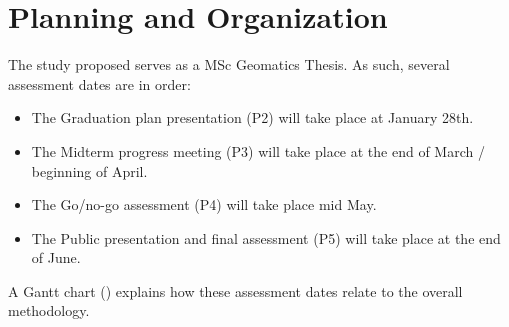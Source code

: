 \newpage
\section{Planning and Organization}

The study proposed serves as a MSc Geomatics Thesis. As such, several assessment dates are in order:   

\begin{itemize}
    \item The Graduation plan presentation (P2) will take place at January 28th. 
    \item The Midterm progress meeting  (P3) will take place at the end of March / beginning of April. 
    \item The Go/no-go assessment (P4) will take place mid May.
    \item The Public presentation and final assessment (P5) will take place at the end of June.
\end{itemize}

A Gantt chart () explains how these assessment dates relate to the overall methodology.




